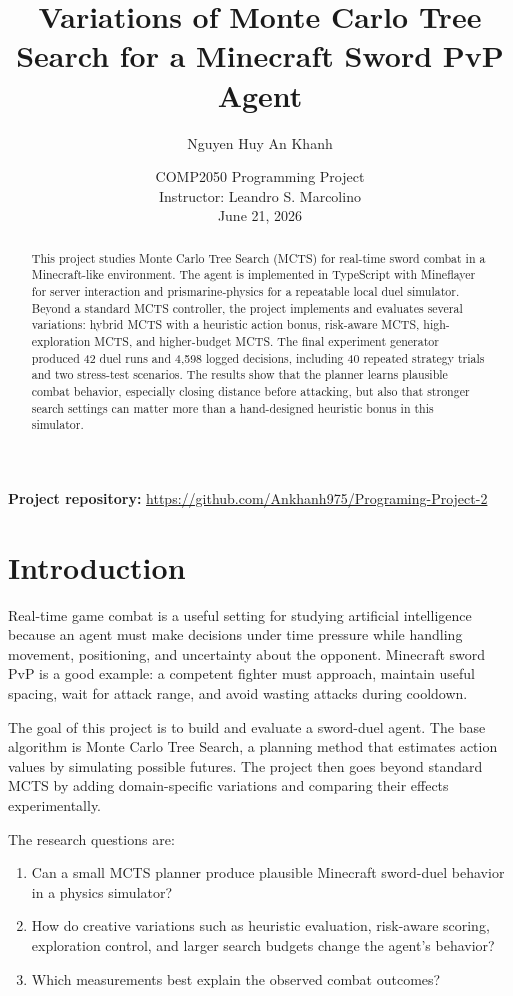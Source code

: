 \documentclass[11pt]{article}
\title{Variations of Monte Carlo Tree Search for a Minecraft Sword PvP Agent}
\author{Nguyen Huy An Khanh}
\date{COMP2050 Programming Project\\Instructor: Leandro S. Marcolino\\June 21, 2026}
\begin{document}
\maketitle

\begin{center}
\textbf{Project repository:} \url{https://github.com/Ankhanh975/Programing-Project-2}
\end{center}

\begin{abstract}
This project studies Monte Carlo Tree Search (MCTS) for real-time sword combat in a Minecraft-like environment. The agent is implemented in TypeScript with Mineflayer for server interaction and prismarine-physics for a repeatable local duel simulator. Beyond a standard MCTS controller, the project implements and evaluates several variations: hybrid MCTS with a heuristic action bonus, risk-aware MCTS, high-exploration MCTS, and higher-budget MCTS. The final experiment generator produced 42 duel runs and 4,598 logged decisions, including 40 repeated strategy trials and two stress-test scenarios. The results show that the planner learns plausible combat behavior, especially closing distance before attacking, but also that stronger search settings can matter more than a hand-designed heuristic bonus in this simulator.
\end{abstract}

\section{Introduction}

Real-time game combat is a useful setting for studying artificial intelligence because an agent must make decisions under time pressure while handling movement, positioning, and uncertainty about the opponent. Minecraft sword PvP is a good example: a competent fighter must approach, maintain useful spacing, wait for attack range, and avoid wasting attacks during cooldown.

The goal of this project is to build and evaluate a sword-duel agent. The base algorithm is Monte Carlo Tree Search, a planning method that estimates action values by simulating possible futures. The project then goes beyond standard MCTS by adding domain-specific variations and comparing their effects experimentally.

The research questions are:
\begin{enumerate}
  \item Can a small MCTS planner produce plausible Minecraft sword-duel behavior in a physics simulator?
  \item How do creative variations such as heuristic evaluation, risk-aware scoring, exploration control, and larger search budgets change the agent's behavior?
  \item Which measurements best explain the observed combat outcomes?
\end{enumerate}
\end{document}
